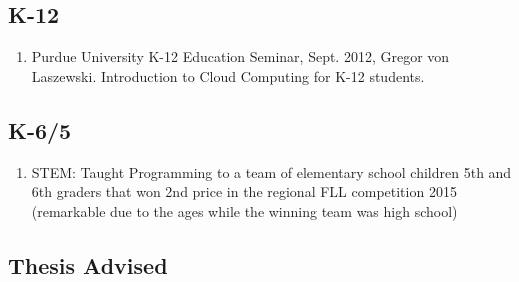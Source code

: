 \documentclass{article}
\begin{document}
\subsection{K-12}

\begin{enumerate}
\item  Purdue University K-12 Education Seminar, Sept. 2012, Gregor von Laszewski. Introduction to Cloud Computing for K-12 students.
\end{enumerate}

\subsection{K-6/5}

\begin{enumerate}
\item  STEM: Taught Programming to a team of elementary school children 5th and 6th graders that won 2nd price in the regional FLL competition 2015 (remarkable due to the ages while the winning team was high school) 
\end{enumerate}

\subsection{Thesis Advised}
\end{document}
